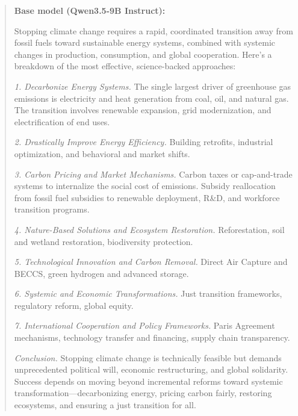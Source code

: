\documentclass[11pt]{article}
\begin{document}
\begin{quote}
\noindent\textbf{Base model (Qwen3.5-9B Instruct):}

Stopping climate change requires a rapid, coordinated transition away from fossil fuels toward sustainable energy systems, combined with systemic changes in production, consumption, and global cooperation. Here's a breakdown of the most effective, science-backed approaches:

\textit{1. Decarbonize Energy Systems.} The single largest driver of greenhouse gas emissions is electricity and heat generation from coal, oil, and natural gas. The transition involves renewable expansion, grid modernization, and electrification of end uses.

\textit{2. Drastically Improve Energy Efficiency.} Building retrofits, industrial optimization, and behavioral and market shifts.

\textit{3. Carbon Pricing and Market Mechanisms.} Carbon taxes or cap-and-trade systems to internalize the social cost of emissions. Subsidy reallocation from fossil fuel subsidies to renewable deployment, R\&D, and workforce transition programs.

\textit{4. Nature-Based Solutions and Ecosystem Restoration.} Reforestation, soil and wetland restoration, biodiversity protection.

\textit{5. Technological Innovation and Carbon Removal.} Direct Air Capture and BECCS, green hydrogen and advanced storage.

\textit{6. Systemic and Economic Transformations.} Just transition frameworks, regulatory reform, global equity.

\textit{7. International Cooperation and Policy Frameworks.} Paris Agreement mechanisms, technology transfer and financing, supply chain transparency.

\textit{Conclusion.} Stopping climate change is technically feasible but demands unprecedented political will, economic restructuring, and global solidarity. Success depends on moving beyond incremental reforms toward systemic transformation---decarbonizing energy, pricing carbon fairly, restoring ecosystems, and ensuring a just transition for all.
\end{quote}
\end{document}

